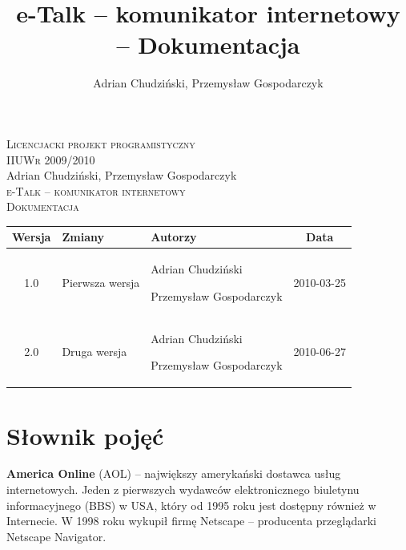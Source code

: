 \documentclass[a4paper,12pt]{article}
\author{Adrian Chudziński, Przemysław Gospodarczyk}
\title{e-Talk -- komunikator internetowy -- Dokumentacja}
\begin{document}
\makeatletter
    \renewcommand\@seccntformat[1]{\csname the#1\endcsname.\quad}
    \renewcommand\numberline[1]{#1.\hskip0.7em}
\makeatother

\begin{titlepage}
\begin{center}

    \textsc{Licencjacki projekt programistyczny}\\[0.1cm]
    \textsc{IIUWr 2009/2010}\\[6cm]
    Adrian Chudziński, Przemysław Gospodarczyk\\[1cm]
    \textsc{\Large e-Talk -- komunikator internetowy}\\[0.25cm]
    \textsc{\large Dokumentacja}\\[8.675cm]

    {\footnotesize
    \begin{tabular}{| c | p{4cm} | p{4.25cm} | c | }
        \hline
        Wersja  &
        Zmiany  &
        Autorzy &
        Data    \\
        \hline
        1.0                                                                   &
        Pierwsza wersja                                                       &
        \par Adrian Chudziński \par Przemysław Gospodarczyk                                                  &
        2010-03-25                                                            \\
        \hline
        2.0                                                                   &
        Druga wersja                                                       &
        \par Adrian Chudziński \par Przemysław Gospodarczyk                                                  &
        2010-06-27                                                            \\
        \hline
    \end{tabular}
    }

\end{center}
\end{titlepage}

\break

\setcounter{page}{2}

\tableofcontents

\break
\section[Słownik pojęć]{Słownik pojęć}
\noindent\textbf{America Online} (AOL) -- największy amerykański dostawca usług internetowych. Jeden z pierwszych wydawców elektronicznego biuletynu informacyjnego (BBS) w USA, który od 1995 roku jest dostępny również w Internecie. W 1998 roku wykupił firmę Netscape -- producenta przeglądarki Netscape Navigator.\\
\end{document}
